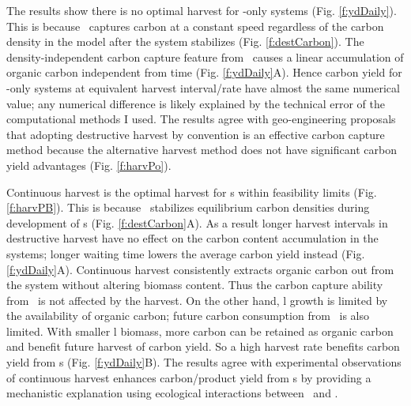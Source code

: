 \documentclass[../thesis.tex]{subfiles} %
\begin{document}
The results show there is no optimal harvest for \phy-only systems (Fig. \ref{f:ydDaily}).  This is because \phy\ captures carbon at a constant speed regardless of the carbon density in the model after the system stabilizes (Fig. \ref{f:destCarbon}).  The density-independent carbon capture feature from \phy\ causes a linear accumulation of organic carbon independent from time (Fig. \ref{f:ydDaily}A).  Hence carbon yield for \phy-only systems at equivalent harvest interval/rate have almost the same numerical value; any numerical difference is likely explained by the technical error of the computational methods I used.  The results agree with geo-engineering proposals that adopting destructive harvest by convention is an effective carbon capture method because the alternative harvest method does not have significant carbon yield advantages (Fig. \ref{f:harvPo}).

Continuous harvest is the optimal harvest for \pbs s within feasibility limits (Fig. \ref{f:harvPB}).  This is because \bac\ stabilizes equilibrium carbon densities during development of \pbs s (Fig. \ref{f:destCarbon}A).  As a result longer harvest intervals in destructive harvest have no effect on the carbon content accumulation in the systems; longer waiting time lowers the average carbon yield instead (Fig. \ref{f:ydDaily}A).  Continuous harvest consistently extracts organic carbon out from the system without altering biomass content.  Thus the carbon capture ability from \phy\ is not affected by the harvest.  On the other hand, \bac l growth is limited by the availability of organic carbon; future carbon consumption from \bac\ is also limited.  With smaller \bac l biomass, more carbon can be retained as organic carbon and benefit future harvest of carbon yield.  So a high harvest rate benefits carbon yield from \pbs s (Fig. \ref{f:ydDaily}B).  The results agree with experimental observations of continuous harvest enhances carbon/product yield from \pbs s \autocite{kim2008anaerobic,choix2012enhanced1,choix2012enhanced2,leyva2014accumulation} by providing a mechanistic explanation using ecological interactions between \phy\ and \bac.
\end{document}

